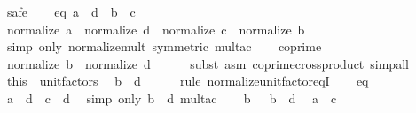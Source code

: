 \begin{isabellebody}
%
\isadelimproof
%
\endisadelimproof
%
\isatagproof
{}\isamarkupfalse%
\ safe\isanewline
\ \ \isamarkupfalse%
\ eq{\isacharcolon}{\kern0pt}\ {\isachardoublequoteopen}a\ {\isacharasterisk}{\kern0pt}\ d\ {\isacharequal}{\kern0pt}\ b\ {\isacharasterisk}{\kern0pt}\ c{\isachardoublequoteclose}\isanewline
\ \ \isamarkupfalse%
\ {\isachardoublequoteopen}normalize\ a\ {\isacharasterisk}{\kern0pt}\ normalize\ d\ {\isacharequal}{\kern0pt}\ normalize\ c\ {\isacharasterisk}{\kern0pt}\ normalize\ b{\isachardoublequoteclose}\isanewline
\ \ \ \ \isamarkupfalse%
\ {\isacharparenleft}{\kern0pt}simp\ only{\isacharcolon}{\kern0pt}\ normalize{\isacharunderscore}{\kern0pt}mult\ {\isacharbrackleft}{\kern0pt}symmetric{\isacharbrackright}{\kern0pt}\ mult{\isacharunderscore}{\kern0pt}ac{\isacharparenright}{\kern0pt}\isanewline
\ \ \isamarkupfalse%
\ coprime\ \isamarkupfalse%
\ {\isachardoublequoteopen}normalize\ b\ {\isacharequal}{\kern0pt}\ normalize\ d{\isachardoublequoteclose}\isanewline
\ \ \ \ \isamarkupfalse%
\ {\isacharparenleft}{\kern0pt}subst\ {\isacharparenleft}{\kern0pt}asm{\isacharparenright}{\kern0pt}\ coprime{\isacharunderscore}{\kern0pt}crossproduct{\isacharparenright}{\kern0pt}\ simp{\isacharunderscore}{\kern0pt}all\isanewline
\ \ \isamarkupfalse%
\ this\ \ unit{\isacharunderscore}{\kern0pt}factors\ \isamarkupfalse%
\ {\isachardoublequoteopen}b\ {\isacharequal}{\kern0pt}\ d{\isachardoublequoteclose}\isanewline
\ \ \ \ \isamarkupfalse%
\ {\isacharparenleft}{\kern0pt}rule\ normalize{\isacharunderscore}{\kern0pt}unit{\isacharunderscore}{\kern0pt}factor{\isacharunderscore}{\kern0pt}eqI{\isacharparenright}{\kern0pt}\isanewline
\ \ \isamarkupfalse%
\ eq\ \isamarkupfalse%
\ {\isachardoublequoteopen}a\ {\isacharasterisk}{\kern0pt}\ d\ {\isacharequal}{\kern0pt}\ c\ {\isacharasterisk}{\kern0pt}\ d{\isachardoublequoteclose}\ \isamarkupfalse%
\ {\isacharparenleft}{\kern0pt}simp\ only{\isacharcolon}{\kern0pt}\ {\isacartoucheopen}b\ {\isacharequal}{\kern0pt}\ d{\isacartoucheclose}\ mult{\isacharunderscore}{\kern0pt}ac{\isacharparenright}{\kern0pt}\isanewline
\ \ \isamarkupfalse%
\ {\isacartoucheopen}b\ {\isasymnoteq}\ {}{\isacartoucheclose}\ {\isacartoucheopen}b\ {\isacharequal}{\kern0pt}\ d{\isacartoucheclose}\ \isamarkupfalse%
\ {\isachardoublequoteopen}a\ {\isacharequal}{\kern0pt}\ c{\isachardoublequoteclose}\ \isamarkupfalse%

\end{isabellebody}
